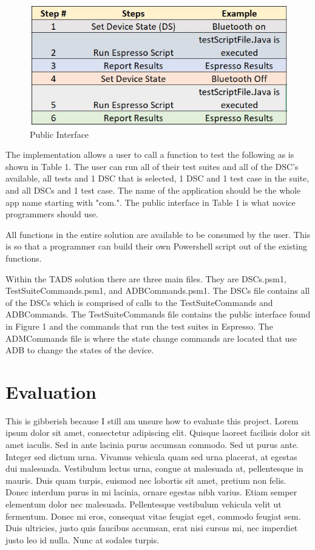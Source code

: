 \begin{figure}[t]
	\centering
	\caption[Public Interface]{Public Interface}
	\label{fig:table1}
	\includegraphics[width=1\linewidth]{table1}
\end{figure}

The implementation allows a user to call a function to test the following as is shown in Table 1.  The user can run all of their test suites and all of the DSC's available, all tests and 1 DSC that is selected, 1 DSC and 1 test case in the suite, and all DSCs and 1 test case. The name of the application should be the whole app name starting with "com.". The public interface in Table 1 is what novice programmers should use.   

All functions in the entire solution are available to be consumed by the user.  This is so that a programmer can build their own Powershell script out of the existing functions.  

Within the TADS solution there are three main files.  They are DSCs.psm1, TestSuiteCommands.psm1, and ADBCommands.psm1.  The DSCs file contains all of the DSCs which is comprised of calls to the TestSuiteCommands and ADBCommands.  The TestSuiteCommands file contains the public interface found in Figure 1 and the commands that run the test suites in Espresso.  The ADMCommands file is where the state change commands are located that use ADB to change the states of the device. 

\section{Evaluation}
This is gibberish because I still am unsure how to evaluate this project.  Lorem ipsum dolor sit amet, consectetur adipiscing elit. Quisque laoreet facilisis dolor sit amet iaculis. Sed in ante lacinia purus accumsan commodo. Sed ut purus ante. Integer sed dictum urna. Vivamus vehicula quam sed urna placerat, at egestas dui malesuada. Vestibulum lectus urna, congue at malesuada at, pellentesque in mauris. Duis quam turpis, euismod nec lobortis sit amet, pretium non felis. Donec interdum purus in mi lacinia, ornare egestas nibh varius. Etiam semper elementum dolor nec malesuada. Pellentesque vestibulum vehicula velit ut fermentum. Donec mi eros, consequat vitae feugiat eget, commodo feugiat sem. Duis ultricies, justo quis faucibus accumsan, erat nisi cursus mi, nec imperdiet justo leo id nulla. Nunc at sodales turpis.

